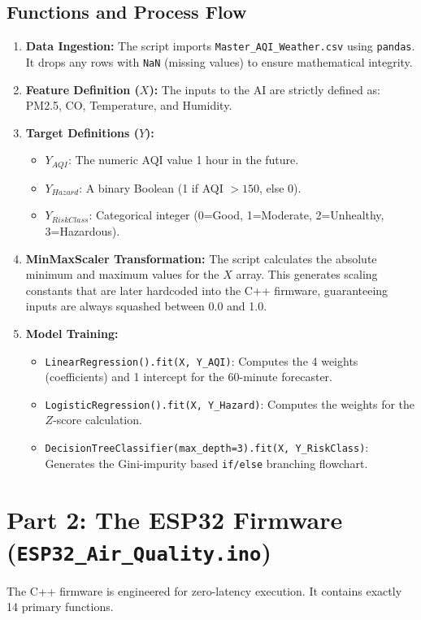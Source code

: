 \documentclass[11pt,a4paper]{article}
\begin{document}
\subsection{Functions and Process Flow}
\begin{enumerate}
    \item \textbf{Data Ingestion:} The script imports \texttt{Master\_AQI\_Weather.csv} using \texttt{pandas}. It drops any rows with \texttt{NaN} (missing values) to ensure mathematical integrity.
    \item \textbf{Feature Definition ($X$):} The inputs to the AI are strictly defined as: PM2.5, CO, Temperature, and Humidity.
    \item \textbf{Target Definitions ($Y$):}
    \begin{itemize}
        \item $Y_{AQI}$: The numeric AQI value 1 hour in the future.
        \item $Y_{Hazard}$: A binary Boolean (1 if AQI $> 150$, else 0).
        \item $Y_{RiskClass}$: Categorical integer (0=Good, 1=Moderate, 2=Unhealthy, 3=Hazardous).
    \end{itemize}
    \item \textbf{MinMaxScaler Transformation:} The script calculates the absolute minimum and maximum values for the $X$ array. This generates scaling constants that are later hardcoded into the C++ firmware, guaranteeing inputs are always squashed between 0.0 and 1.0.
    \item \textbf{Model Training:}
    \begin{itemize}
        \item \texttt{LinearRegression().fit(X, Y\_AQI)}: Computes the 4 weights (coefficients) and 1 intercept for the 60-minute forecaster.
        \item \texttt{LogisticRegression().fit(X, Y\_Hazard)}: Computes the weights for the $Z$-score calculation.
        \item \texttt{DecisionTreeClassifier(max\_depth=3).fit(X, Y\_RiskClass)}: Generates the Gini-impurity based \texttt{if/else} branching flowchart.
    \end{itemize}
\end{enumerate}

\section{Part 2: The ESP32 Firmware (\texttt{ESP32\_Air\_Quality.ino})}
The C++ firmware is engineered for zero-latency execution. It contains exactly 14 primary functions.
\end{document}

